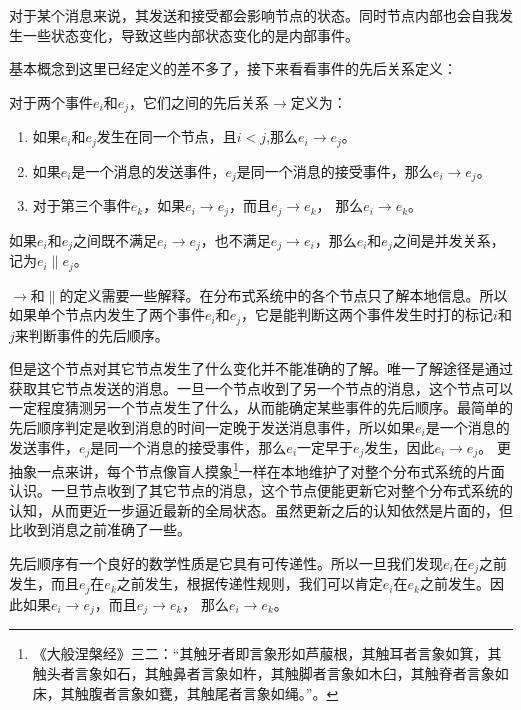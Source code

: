 对于某个消息来说，其发送和接受都会影响节点的状态。同时节点内部也会自我发生一些状态变化，导致这些内部状态变化的是内部事件。

基本概念到这里已经定义的差不多了，接下来看看事件的先后关系定义：

\begin{definition}
    对于两个事件$e_i$和$e_j$，它们之间的先后关系$\rightarrow$定义为：
    \begin{enumerate}
        \item 如果$e_i$和$e_j$发生在同一个节点，且$i < j$,那么$e_i \rightarrow e_j$。
        \item 如果$e_i$是一个消息的发送事件，$e_j$是同一个消息的接受事件，那么$e_i \rightarrow e_j$。
        \item 对于第三个事件$e_k$，如果$e_i \rightarrow e_j$，而且$e_j \rightarrow e_k$， 那么$e_i \rightarrow e_k$。
    \end{enumerate}
    
    如果$e_i$和$e_j$之间既不满足$e_i \rightarrow e_j$，也不满足$e_j \rightarrow e_i$，那么$e_i$和$e_j$之间是并发关系，记为$e_i \parallel e_j$。
\end{definition}

$\rightarrow$和$\parallel$的定义需要一些解释。在分布式系统中的各个节点只了解本地信息。所以如果单个节点内发生了两个事件$e_i$和$e_j$，它是能判断这两个事件发生时打的标记$i$和$j$来判断事件的先后顺序。

但是这个节点对其它节点发生了什么变化并不能准确的了解。唯一了解途径是通过获取其它节点发送的消息。一旦一个节点收到了另一个节点的消息，这个节点可以一定程度猜测另一个节点发生了什么，从而能确定某些事件的先后顺序。最简单的先后顺序判定是收到消息的时间一定晚于发送消息事件，所以如果$e_i$是一个消息的发送事件，$e_j$是同一个消息的接受事件，那么$e_i$一定早于$e_j$发生，因此$e_i \rightarrow e_j$。 更抽象一点来讲，每个节点像盲人摸象\footnote{《大般涅槃经》三二：“其触牙者即言象形如芦菔根，其触耳者言象如箕，其触头者言象如石，其触鼻者言象如杵，其触脚者言象如木臼，其触脊者言象如床，其触腹者言象如甕，其触尾者言象如绳。”。}一样在本地维护了对整个分布式系统的片面认识。一旦节点收到了其它节点的消息，这个节点便能更新它对整个分布式系统的认知，从而更近一步逼近最新的全局状态。虽然更新之后的认知依然是片面的，但比收到消息之前准确了一些。

先后顺序有一个良好的数学性质是它具有可传递性。所以一旦我们发现$e_i$在$e_j$之前发生，而且$e_j$在$e_k$之前发生，根据传递性规则，我们可以肯定$e_i$在$e_k$之前发生。因此如果$e_i \rightarrow e_j$，而且$e_j \rightarrow e_k$， 那么$e_i \rightarrow e_k$。

